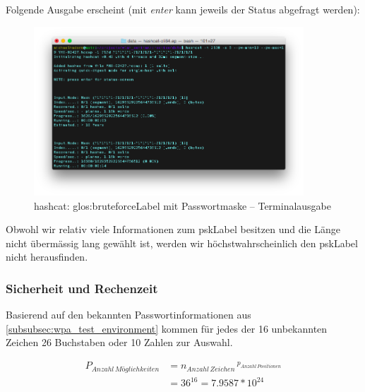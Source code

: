 \clearpage
Folgende Ausgabe erscheint (mit \textit{enter} kann jeweils der Status abgefragt werden):
\begin{figure}[H]
	\centering
	\includegraphics[width=0.9\textwidth]{images/wpa/hashcat_bruteforce_pattern.png}
	\caption[hashcat: Bruteforce mit Passwortmaske -- Terminalausgabe]{hashcat: \gls{glos:bruteforceLabel} mit Passwortmaske -- Terminalausgabe}\label{fig:hashcat_bruteforce_pattern}
\end{figure}

Obwohl wir relativ viele Informationen zum \gls{pskLabel} besitzen und die Länge nicht übermässig lang gewählt ist, werden wir höchstwahrscheinlich den \gls{pskLabel} nicht herausfinden.


\subsubsection{Sicherheit und Rechenzeit}

Basierend auf den bekannten Passwortinformationen aus \cref{subsubsec:wpa_test_environment} kommen für jedes der 16 unbekannten Zeichen 26 Buchstaben oder 10 Zahlen zur Auswahl.

\begin{equation}
	\begin{split}
	\label{eqn:wpa_attack_key_possibelities}
	P_{Anzahl\,Möglichkeiten} &= n_{Anzahl\,Zeichen}\,^{p_{Anzahl\,Positionen}}\\
	&= 36^{16} = 7.9587 * 10^{24}
	\end{split}
\end{equation}

